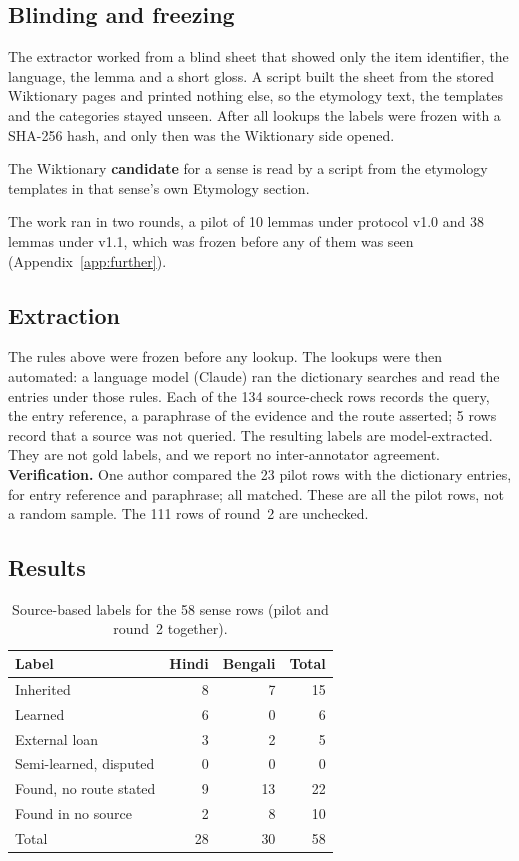 \documentclass[11pt]{article}
\begin{document}
\subsection{Blinding and freezing}

The extractor worked from a blind sheet that showed only the item identifier, the language, the lemma and a short gloss. A script built the sheet from the stored Wiktionary pages and printed nothing else, so the etymology text, the templates and the categories stayed unseen. After all lookups the labels were frozen with a SHA-256 hash, and only then was the Wiktionary side opened.

The Wiktionary \textbf{candidate} for a sense is read by a script from the etymology templates in that sense's own Etymology section.

The work ran in two rounds, a pilot of 10 lemmas under protocol v1.0 and 38 lemmas under v1.1, which was frozen before any of them was seen (Appendix~\ref{app:further}).

\subsection{Extraction}
\label{sec:extraction}

The rules above were frozen before any lookup. The lookups were then automated: a language model (Claude) ran the dictionary searches and read the entries under those rules. Each of the 134 source-check rows records the query, the entry reference, a paraphrase of the evidence and the route asserted; 5 rows record that a source was not queried. The resulting labels are model-extracted. They are not gold labels, and we report no inter-annotator agreement. \textbf{Verification.} One author compared the 23 pilot rows with the dictionary entries, for entry reference and paraphrase; all matched. These are all the pilot rows, not a random sample. The 111 rows of round~2 are unchecked.

\subsection{Results}

\begin{table}[h]
\centering\small
\begin{tabular}{lrrr}
\toprule
\textbf{Label} & \textbf{Hindi} & \textbf{Bengali} & \textbf{Total} \\
\midrule
Inherited & 8 & 7 & 15 \\
Learned & 6 & 0 & 6 \\
External loan & 3 & 2 & 5 \\
Semi-learned, disputed & 0 & 0 & 0 \\
\midrule
Found, no route stated & 9 & 13 & 22 \\
Found in no source & 2 & 8 & 10 \\
\midrule
Total & 28 & 30 & 58 \\
\bottomrule
\end{tabular}
\caption{Source-based labels for the 58 sense rows (pilot and round~2 together).}
\label{tab:labels}
\end{table}
\end{document}
